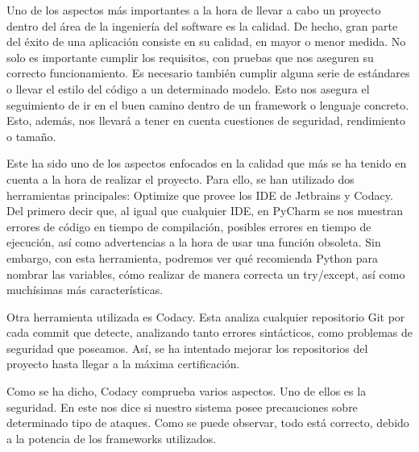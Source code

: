 Uno de los aspectos más importantes a la hora de llevar a cabo un proyecto dentro del área de la ingeniería del software es la calidad. De hecho, gran parte del éxito de una aplicación consiste en su calidad, en mayor o menor medida. No solo es importante cumplir los requisitos, con pruebas que nos aseguren su correcto funcionamiento. Es necesario también cumplir alguna serie de estándares o llevar el estilo del código a un determinado modelo. Esto nos asegura el seguimiento de ir en el buen camino dentro de un framework o lenguaje concreto. Esto, además, nos llevará a tener en cuenta cuestiones de seguridad, rendimiento o tamaño.

Este ha sido uno de los aspectos enfocados en la calidad que más se ha tenido en cuenta a la hora de realizar el proyecto. Para ello, se han utilizado dos herramientas principales: Optimize que provee los IDE de Jetbrains y Codacy. Del primero decir que, al igual que cualquier IDE, en PyCharm se nos muestran errores de código en tiempo de compilación, posibles errores en tiempo de ejecución, así como advertencias a la hora de usar una función obsoleta. Sin embargo, con esta herramienta, podremos ver qué recomienda Python para nombrar las variables, cómo realizar de manera correcta un try/except, así como muchísimas más características.

Otra herramienta utilizada es Codacy. Esta analiza cualquier repositorio Git por cada commit que detecte, analizando tanto errores sintácticos, como problemas de seguridad que poseamos. Así, se ha intentado mejorar los repositorios del proyecto hasta llegar a la máxima certificación.


Como se ha dicho, Codacy comprueba varios aspectos. Uno de ellos es la seguridad. En este nos dice si nuestro sistema posee precauciones sobre determinado tipo de ataques. Como se puede observar, todo está correcto, debido a la potencia de los frameworks utilizados.

